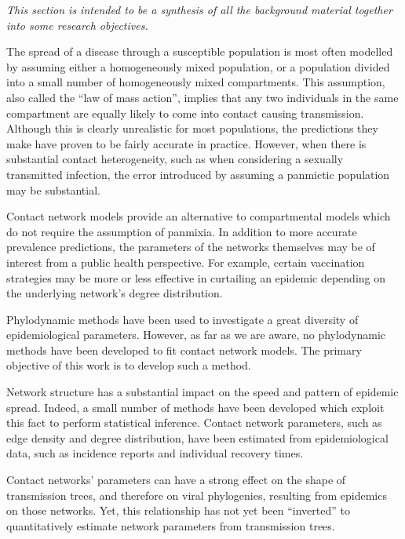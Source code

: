 \itshape
This section is intended to be a synthesis of all the background material
together into some research objectives.
\normalfont

The spread of a disease through a susceptible population is most often modelled
by assuming either a homogeneously mixed population, or a population divided
into a small number of homogeneously mixed compartments. This assumption, also
called the ``law of mass action'', implies that any two individuals in the same
compartment are equally likely to come into contact causing transmission.
Although this is clearly unrealistic for most populations, the predictions they
make have proven to be fairly accurate in practice. However, when there is
substantial contact heterogeneity, such as when considering a sexually
transmitted infection, the error introduced by assuming a panmictic population
may be substantial.

Contact network models provide an alternative to compartmental models which do
not require the assumption of panmixia. In addition to more accurate
prevalence predictions, the parameters of the networks themselves may be of
interest from a public health perspective. For example, certain vaccination
strategies may be more or less effective in curtailing an epidemic depending on
the underlying network's degree distribution.

Phylodynamic methods have been used to investigate a great diversity of
epidemiological parameters. However, as far as we are aware, no phylodynamic
methods have been developed to fit contact network models. The primary
objective of this work is to develop such a method.

Network structure has a substantial impact on the speed and pattern of epidemic
spread. Indeed, a small number of methods have been developed which exploit
this fact to perform statistical inference. Contact network parameters, such as
edge density and degree distribution, have been estimated from epidemiological
data, such as incidence reports and individual recovery times.

Contact networks' parameters can have a strong effect on the shape of
transmission trees, and therefore on viral phylogenies, resulting from
epidemics on those networks. Yet, this relationship has not yet been
``inverted'' to quantitatively estimate network parameters from transmission
trees.

\newcommand{\G}{\mathcal{G}}
\newcommand{\Nu}{\mathcal{N}}

